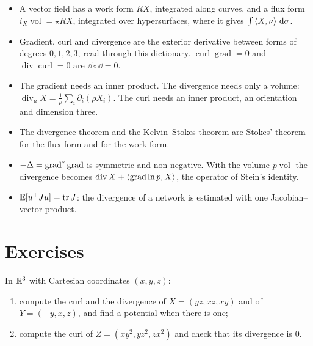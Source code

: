\begin{notechapter}
\begin{chaptersummary}
\begin{itemize}[nosep]
  \item A vector field has a work form $RX$, integrated along curves,
        and a flux form $i_X\operatorname{vol} = \star RX$, integrated
        over hypersurfaces, where it gives $\int\left\langle X, \nu \right\rangle\,\mathrm{d}\sigma$.
  \item Gradient, curl and divergence are the exterior derivative
        between forms of degrees $0, 1, 2, 3$, read through this
        dictionary. $\operatorname{curl}\operatorname{grad} = 0$ and
        $\operatorname{div}\operatorname{curl} = 0$ are
        $\dd\circ\dd = 0$.
  \item The gradient needs an inner product. The divergence needs only
        a volume: $\operatorname{div}_\mu X
        = \frac1\rho\sum_i\partial_i(\rho X_i)$. The curl needs an
        inner product, an orientation and dimension three.
  \item The divergence theorem and the Kelvin--Stokes theorem are
        Stokes' theorem for the flux form and for the work form.
  \item $-\Delta = \operatorname{grad}^{*}\operatorname{grad}$ is
        symmetric and non-negative. With the volume $p\operatorname{vol}$
        the divergence becomes $\operatorname{div}X
        + \left\langle \operatorname{grad}\ln p, X \right\rangle$, the operator of Stein's
        identity.
  \item $\mathbb{E}[u^\top Ju] = \operatorname{tr} J$: the divergence of a network is
        estimated with one Jacobian--vector product.
\end{itemize}
\end{chaptersummary}

\section*{Exercises}

\begin{exercise}\label{vector-calculus:exr:1}
In $\mathbb{R}^3$ with Cartesian coordinates $(x, y, z)$:
\begin{enumerate}[nosep]
  \item compute the curl and the divergence of $X = (yz, xz, xy)$ and
        of $Y = (-y, x, z)$, and find a potential when there is one;
  \item compute the curl of $Z = (xy^2, yz^2, zx^2)$ and check that
        its divergence is $0$.
\end{enumerate}
\end{exercise}


\end{notechapter}
